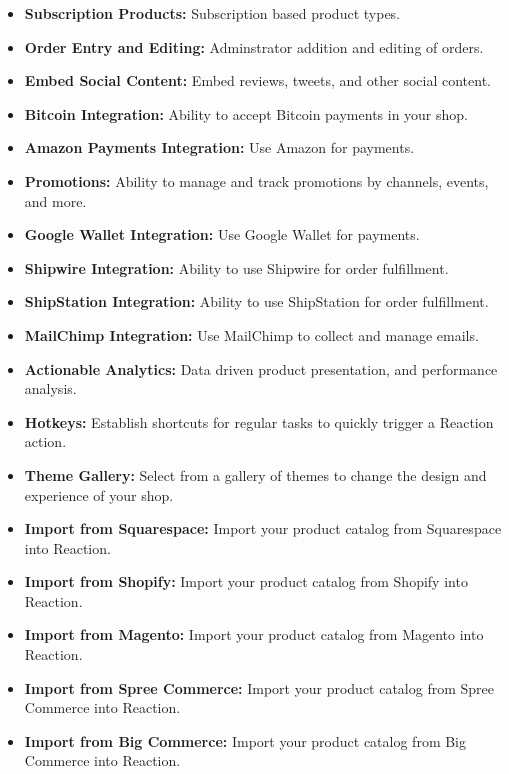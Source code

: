 \begin{itemize}
	\item \textbf{ Subscription Products:} Subscription based product types.
	
	\item \textbf{ Order Entry and Editing:} Adminstrator addition and editing of orders.
	
	\item \textbf{ Embed Social Content:} Embed reviews, tweets, and other social content.
	
	\item \textbf{ Bitcoin Integration:} Ability to accept Bitcoin payments in your shop.
	
	\item \textbf{ Amazon Payments Integration:} Use Amazon for payments.
	
	\item \textbf{ Promotions:} Ability to manage and track promotions by channels, events, and more.
	
	\item \textbf{ Google Wallet Integration:} Use Google Wallet for payments.
	
	\item \textbf{ Shipwire Integration:} Ability to use Shipwire for order fulfillment.
	
	\item \textbf{ ShipStation Integration:} Ability to use ShipStation for order fulfillment.
	
	\item \textbf{ MailChimp Integration:} Use MailChimp to collect and manage emails.
	
	\item \textbf{ Actionable Analytics:} Data driven product presentation, and performance analysis.
	
	\item \textbf{ Hotkeys:} Establish shortcuts for regular tasks to quickly trigger a Reaction action.
	
	\item \textbf{ Theme Gallery:} Select from a gallery of themes to change the design and experience of your shop.
	
	\item \textbf{ Import from Squarespace:} Import your product catalog from Squarespace into Reaction.
	
	\item \textbf{ Import from Shopify:} Import your product catalog from Shopify into Reaction.
	
	\item \textbf{ Import from Magento:} Import your product catalog from Magento into Reaction.
	
	\item \textbf{ Import from Spree Commerce:} Import your product catalog from Spree Commerce into Reaction.
	
	\item \textbf{ Import from Big Commerce:} Import your product catalog from Big Commerce into Reaction.
	
\end{itemize}


